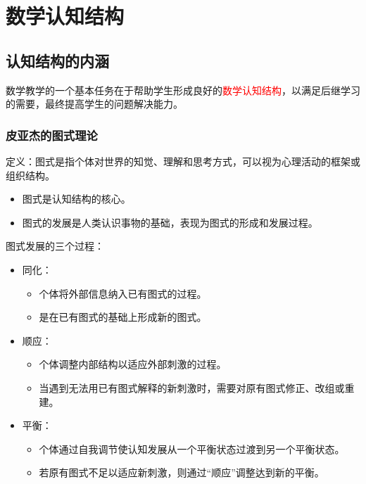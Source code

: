 \chapter{数学认知结构}

\section{认知结构的内涵}

数学教学的一个基本任务在于帮助学生形成良好的\textcolor{red}{数学认知结构}，以满足后继学习的需要，最终提高学生的问题解决能力。

\begin{multicols}{2}

\subsection{皮亚杰的图式理论}

定义：图式是指个体对世界的知觉、理解和思考方式，可以视为心理活动的框架或组织结构。

\begin{itemize}
    \item 图式是认知结构的核心。
    \item 图式的发展是人类认识事物的基础，表现为图式的形成和发展过程。
\end{itemize}

\vspace{\baselineskip}


图式发展的三个过程：
\begin{itemize}
    \item 同化：
    \begin{itemize}
        \item 个体将外部信息纳入已有图式的过程。
        \item 是在已有图式的基础上形成新的图式。
    \end{itemize}
    \item 顺应：
    \begin{itemize}
        \item 个体调整内部结构以适应外部刺激的过程。
        \item 当遇到无法用已有图式解释的新刺激时，需要对原有图式修正、改组或重建。
    \end{itemize}
    \item 平衡：
    \begin{itemize}
        \item 个体通过自我调节使认知发展从一个平衡状态过渡到另一个平衡状态。
        \item 若原有图式不足以适应新刺激，则通过“顺应”调整达到新的平衡。
    \end{itemize}
\end{itemize}


\end{multicols}
